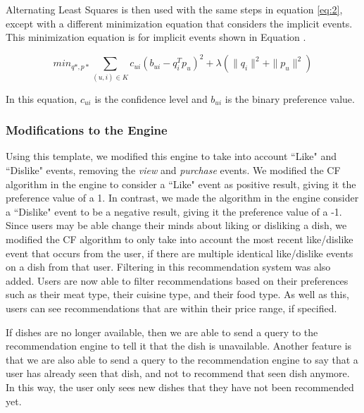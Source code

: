 
Alternating Least Squares is then used with the same steps in equation \ref{eq:2}, except with a different minimization equation that considers the implicit events. This minimization equation is for implicit events shown in Equation \cite{implicit}.

\begin{equation}\label{eq:3}\tag{3}
\displaystyle min_{q*,p*} \sum_{ (u,i) \in K} c_{ui}(b_{ui} - q_{i}^T p_{u})^2 + \lambda (\| q_{i} \|^2 + \| p_{u} \|^2 )
\end{equation}

In this equation, \begin{math} c_{ui} \end{math} is the confidence level and \begin{math} b_{ui} \end{math} is the binary preference value. 

\subsubsection{Modifications to the Engine}

Using this template, we modified this engine to take into account ``Like" and ``Dislike" events, removing the \textit{view} and \textit{purchase} events. We modified the CF algorithm in the engine to consider a ``Like" event as positive result, giving it the preference value of a 1. In contrast, we made the algorithm in the engine consider a ``Dislike" event to be a negative result, giving it the preference value of a -1. Since users may be able change their minds about liking or disliking a dish, we modified the CF algorithm to only take into account the most recent like/dislike event that occurs from the user, if there are multiple identical like/dislike events on a dish from that user. Filtering in this recommendation system was also added. Users are now able to filter recommendations based on their preferences such as their meat type, their cuisine type, and their food type. As well as this, users can see recommendations that are within their price range, if specified. 

If dishes are no longer available, then we are able to send a query to the recommendation engine to tell it that the dish is unavailable. Another feature is that we are also able to send a query to the recommendation engine to say that a user has already seen that dish, and not to recommend that seen dish anymore. In this way, the user only sees new dishes that they have not been recommended yet.

